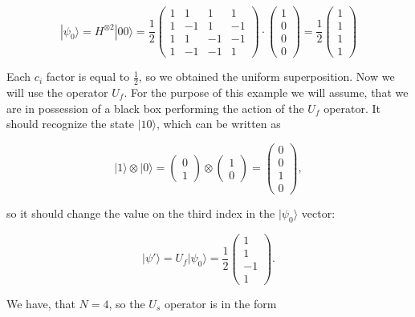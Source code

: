 \begin{example}
\[ |\psi_0\rangle = H^{\otimes 2} |00\rangle = \frac{1}{2} \begin{pmatrix} 1 & 1 & 1 & 1 \\ 1 & -1 & 1 & -1 \\ 1 & 1 & -1 & -1 \\ 1 & -1 & -1 & 1\end{pmatrix} \cdot \begin{pmatrix} 1 \\ 0 \\ 0 \\ 0 \end{pmatrix} = \frac{1}{2} \begin{pmatrix} 1 \\ 1 \\ 1 \\ 1 \end{pmatrix}\]

Each $c_i$ factor is equal to $\frac{1}{2}$, so we obtained the uniform superposition. Now we will use the operator $U_f$. For the purpose of this example we will assume, that we are in possession of a black box performing the action of the $U_f$ operator. It should recognize the state $|10\rangle$, which can be written as

\[ |1\rangle \otimes |0\rangle = \begin{pmatrix} 0 \\ 1 \end{pmatrix} \otimes \begin{pmatrix} 1 \\ 0 \end{pmatrix} = \begin{pmatrix} 0 \\ 0 \\ 1 \\ 0 \end{pmatrix},\]

so it should change the value on the third index in the $|\psi_0\rangle$ vector:

\[ |\psi'\rangle = U_f |\psi_0\rangle = \frac{1}{2}\begin{pmatrix} 1 \\ 1 \\ -1 \\ 1 \end{pmatrix}. \]

We have, that $N = 4$, so the $U_s$ operator is in the form


\end{example}

